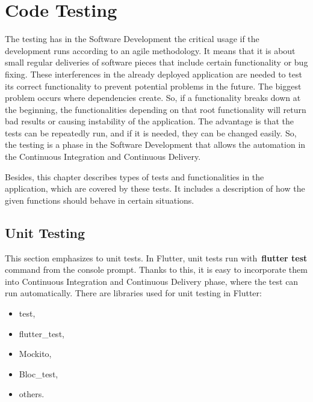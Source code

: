 \section{Code Testing}\label{sec:code-testing}
The testing has in the Software Development the critical usage if the development runs according to an agile methodology.
It means that it is about small regular deliveries of software pieces that include certain functionality or bug fixing.
These interferences in the already deployed application are needed to test its correct functionality to prevent potential problems in the future.
The biggest problem occurs where dependencies create.
So, if a functionality breaks down at the beginning, the functionalities depending on that root functionality will return bad results or causing instability of the application.
The advantage is that the tests can be repeatedly run, and if it is needed, they can be changed easily.
So, the testing is a phase in the Software Development that allows the automation in the Continuous Integration and Continuous Delivery.

Besides, this chapter describes types of tests and functionalities in the application, which are covered by these tests.
It includes a description of how the given functions should behave in certain situations.


\subsection{Unit Testing}\label{subsec:unit-testing}
This section emphasizes to unit tests.
In Flutter, unit tests run with~\textbf{flutter test} command from the console prompt.
Thanks to this, it is easy to incorporate them into Continuous Integration and Continuous Delivery phase, where the test can run automatically.
There are libraries used for unit testing in Flutter:
\begin{itemize}
    \item test,
    \item flutter\_test,
    \item Mockito,
    \item Bloc\_test,
    \item others.
\end{itemize}

